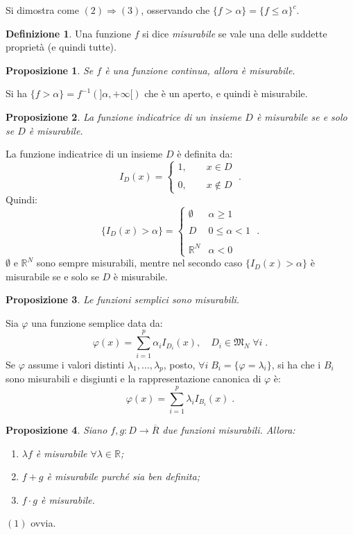 \documentclass[a4paper,12pt]{report}
\theoremstyle{plain}
\newtheorem{prop}{Proposizione}[section]
\theoremstyle{definition}
\newtheorem{defn}{Definizione}[section]
\theoremstyle{remark}
\numberwithin{equation}{section}
\begin{document}
Si dimostra come $(2) \Longrightarrow (3)$, osservando che $\{f>\alpha\}=\{f\le \alpha\}^c$.
\endproof
\begin{defn} Una funzione $f$ si dice \textit{misurabile} se vale una delle suddette proprietà (e quindi tutte).
\end{defn}
\begin{prop} Se $f$ è una funzione continua, allora è misurabile.
\end{prop}
\proof Si ha $\{f>\alpha\}=f^{-1}(]\alpha,+\infty[)$ che è un aperto, e quindi è misurabile.
\endproof
\begin{prop} La funzione indicatrice di un insieme $D$ è misurabile se e solo se $D$ è misurabile.
\end{prop}
\proof La funzione indicatrice di un insieme $D$ è definita da:
\begin{equation}
I_D(x)=\begin{cases}
        1,\qquad x \in D\\
\\
0,\qquad x \not\in D
       \end{cases}\;.
\end{equation}
Quindi:
\begin{equation}
\{I_D(x)>\alpha\}= \left\{ \begin{matrix}
\emptyset &\alpha\ge 1 \\
\\
D & 0\le \alpha<1 \\
\\
\mathbb{R}^N & \alpha<0
\end{matrix}
\right.\;.
\end{equation}
$\emptyset$ e $\mathbb{R}^N$ sono sempre misurabili, mentre nel secondo caso $\{I_D(x)>\alpha\}$ è misurabile se e solo se $D$ è 
misurabile.
\endproof
\begin{prop} Le funzioni semplici sono misurabili.
\end{prop}
\proof Sia $\varphi$ una funzione semplice data da:
\begin{equation}
\varphi(x)=\sum_{i=1}^p \alpha_i I_{D_i}(x), \quad D_i \in \mathfrak{M}_N\; \forall i\;.
\end{equation}
Se $\varphi$ assume i valori distinti $\lambda_1,\ldots,\lambda_p$, posto, $\forall i \; B_i=\{\varphi=\lambda_i\}$, si ha che i $B_i$ sono
misurabili e disgiunti e la rappresentazione canonica di $\varphi$ è:
\begin{equation}
\varphi(x)=\sum_{i=1}^p \lambda_i I_{B_i}(x)\;.
\end{equation}
\endproof
\begin{prop} Siano $f,g:D\to\overline{R}$ due funzioni misurabili. Allora:
\begin{enumerate}
 \item $\lambda f$ è misurabile $\forall \lambda \in \mathbb{R}$;
 \item $f+g$ è misurabile purché sia ben definita;
 \item $f\cdot g$ è misurabile.
\end{enumerate}
\end{prop}
\proof $(1)$ ovvia. \\
\end{document}
